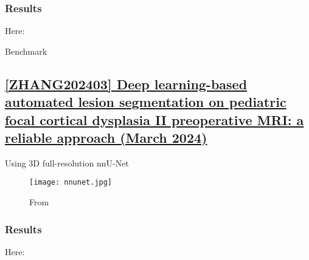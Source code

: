 \subsubsection{Results}

Here: 

\begin{table}[htbp]
	\centering
	\caption{Benchmark}

	\caption{Results from }
	\label{tab:res10}
\end{table}

\newpage
\subsection{\href{https://pmc.ncbi.nlm.nih.gov/articles/PMC10933224/}{[ZHANG202403] Deep learning-based automated lesion segmentation on pediatric focal cortical dysplasia II preoperative MRI: a reliable approach (March 2024) }}
\label{res11}

Using 3D full-resolution nnU-Net
\begin{figure}[htbp]
	\centering
	\texttt{[image: nnunet.jpg]}
	\caption{From }%
	\label{fig:res11}
\end{figure}

\subsubsection{Results}

Here: 

